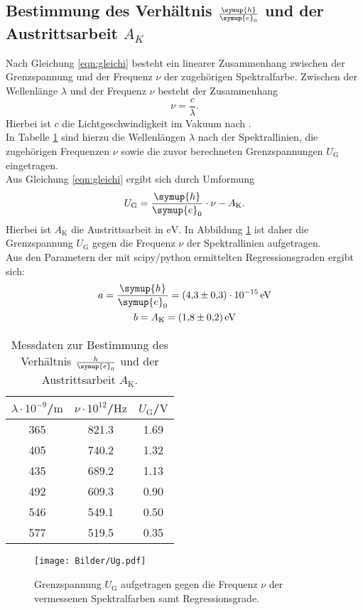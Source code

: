 \subsection{Bestimmung des Verhältnis $\frac{\symup{h}}{\symup{e}_0}$ und der Austrittsarbeit $A_{K}$}
Nach Gleichung \eqref{eqn:gleichi} besteht ein linearer Zusammenhang zwischen der Grenzspannung und der Frequenz $\nu$ der zugehörigen Spektralfarbe.
Zwischen der Wellenlänge $\lambda$ und der Frequenz $\nu$ besteht der Zusammenhang
\begin{equation*}
  \nu=\frac{c}{\lambda} \text{.}
\end{equation*}
Hierbei ist $c$ die Lichtgeschwindigkeit im Vakuum nach \cite{c}.\\
In Tabelle \ref{tab:ak} sind hierzu die Wellenlängen $\lambda$ nach \cite{Anleitung} der Spektrallinien, die zugehörigen Frequenzen $\nu$ sowie die zuvor berechneten Grenzspannungen $U_\mathrm{G}$ eingetragen.\\
Aus Gleichung \eqref{eqn:gleichi} ergibt sich durch Umformung
\begin{equation*}
  U_\mathrm{G}=\frac{\symup{h}}{\symup{e}_0} \cdot{\nu}-A_\mathrm{K} \text{.}
\end{equation*}
Hierbei ist $A_\mathrm{K}$ die Austrittsarbeit in $\si{\electronvolt}$.
In Abbildung \ref{fig:ak} ist daher die Grenzspannung $U_\mathrm{G}$ gegen die Frequenz $\nu$ der Spektrallinien aufgetragen.\\
Aus den Parametern der mit scipy/python \cite{scipy} ermittelten Regressionsgraden ergibt sich:
\begin{gather*}
  a=\frac{\symup{h}}{\symup{e}_0}= \SI{4.3(3)e-15}{\electronvolt}\\
b=A_\mathrm{K}=\SI{1.8(2)}{\electronvolt}
\end{gather*}


\begin{table}
  \centering
\caption{Messdaten zur Bestimmung des Verhältnis $\frac{h}{\symup{e}_0}$ und der Austrittsarbeit $A_\mathrm{K}$.}
\label{tab:ak}
\begin{tabular}{ccc}
  \toprule
$\lambda \cdot 10^{-9}$/$\si{\meter}$& $\nu \cdot 10^{12}$/$\si{\hertz}$ & $U_\mathrm{G}$/$\si{\volt}$ \\
\midrule
365 & 821.3 & 1.69 \\
405 & 740.2 & 1.32 \\
435 & 689.2 & 1.13 \\
492 & 609.3 & 0.90 \\
546 & 549.1 & 0.50 \\
577 & 519.5 & 0.35 \\
\bottomrule
\end{tabular}
\end{table}
\begin{figure}
  \centering
  \caption{Grenzspannung $U_\mathrm{G}$ aufgetragen gegen die Frequenz $\nu$ der vermessenen Spektralfarben samt Regressionsgrade.}
  \label{fig:ak}
  \texttt{[image: Bilder/Ug.pdf]}
\end{figure}


